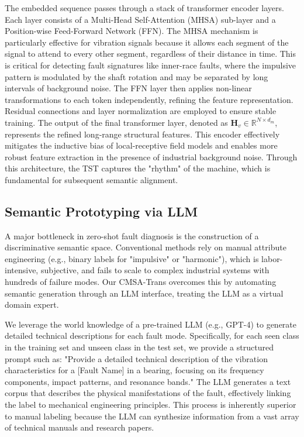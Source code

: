 The embedded sequence passes through a stack of transformer encoder layers. Each layer consists of a Multi-Head Self-Attention (MHSA) sub-layer and a Position-wise Feed-Forward Network (FFN). The MHSA mechanism is particularly effective for vibration signals because it allows each segment of the signal to attend to every other segment, regardless of their distance in time. This is critical for detecting fault signatures like inner-race faults, where the impulsive pattern is modulated by the shaft rotation and may be separated by long intervals of background noise. The FFN layer then applies non-linear transformations to each token independently, refining the feature representation. Residual connections and layer normalization are employed to ensure stable training. The output of the final transformer layer, denoted as $\mathbf{H}_v \in \mathbb{R}^{N \times d_m}$, represents the refined long-range structural features. This encoder effectively mitigates the inductive bias of local-receptive field models and enables more robust feature extraction in the presence of industrial background noise. Through this architecture, the TST captures the "rhythm" of the machine, which is fundamental for subsequent semantic alignment.

\subsection{Semantic Prototyping via LLM}
A major bottleneck in zero-shot fault diagnosis is the construction of a discriminative semantic space. Conventional methods rely on manual attribute engineering (e.g., binary labels for "impulsive" or "harmonic"), which is labor-intensive, subjective, and fails to scale to complex industrial systems with hundreds of failure modes. Our CMSA-Trans overcomes this by automating semantic generation through an LLM interface, treating the LLM as a virtual domain expert.

We leverage the world knowledge of a pre-trained LLM (e.g., GPT-4) to generate detailed technical descriptions for each fault mode. Specifically, for each seen class in the training set and unseen class in the test set, we provide a structured prompt such as: "Provide a detailed technical description of the vibration characteristics for a [Fault Name] in a bearing, focusing on its frequency components, impact patterns, and resonance bands." The LLM generates a text corpus that describes the physical manifestations of the fault, effectively linking the label to mechanical engineering principles. This process is inherently superior to manual labeling because the LLM can synthesize information from a vast array of technical manuals and research papers.

